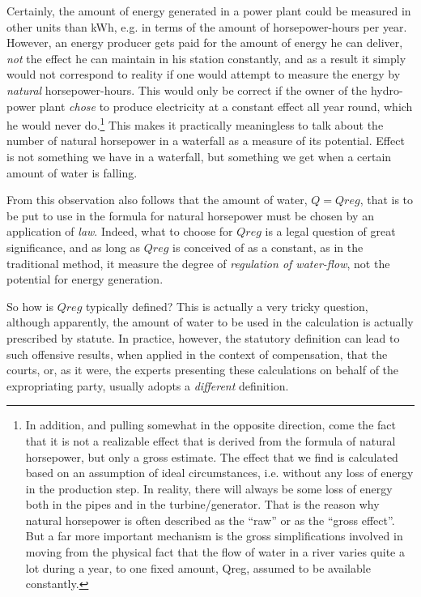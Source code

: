 Certainly, the amount of energy generated in a power plant could be measured in other units than kWh, e.g. in terms of the amount of horsepower-hours per year. However, an energy producer gets paid for the amount of energy he can deliver, \emph{not} the effect he can maintain in his station constantly, and as a result it simply would not correspond to reality if one would attempt to measure the energy by \emph{natural} horsepower-hours. This would only be correct if the owner of the hydro-power plant \emph{chose} to produce electricity at a constant effect all year round, which he would never do.\footnote{In addition, and pulling somewhat in the opposite direction, come the fact that it is not a realizable effect that is derived from the formula of natural horsepower, but only a gross estimate. The effect that we find is calculated based on an assumption of ideal circumstances, i.e. without any loss of energy in the production step. In reality, there will always be some loss of energy both in the pipes and in the turbine/generator. That is the reason why natural horsepower is often described as the “raw” or as the “gross effect”. But a far more important mechanism is the gross simplifications involved in moving from the physical fact that the flow of water in a river varies quite a lot during a year, to one fixed amount, Qreg, assumed to be available constantly.}
This makes it practically meaningless to talk about the number of natural horsepower in a waterfall as a measure of its potential. Effect is not something we have in a waterfall, but something we get when a certain amount of water is falling. 

From this observation also follows that the amount of water, $Q = Qreg$, that is to be put to use in the formula for natural horsepower must be chosen by an application of \emph{law}. Indeed, what to choose for $Qreg$ is a legal question of great significance, and as long as $Qreg$ is conceived of as a constant, as in the traditional method, it measure the degree of \emph{regulation of water-flow}, not the potential for energy generation.

So how is $Qreg$ typically defined? This is actually a very tricky question, although apparently, the amount of water to be used in the calculation is actually prescribed by statute. In practice, however, the statutory definition can lead to such offensive results, when applied in the context of compensation, that the courts, or, as it were, the experts presenting these calculations on behalf of the expropriating party, usually adopts a \emph{different} definition. 


